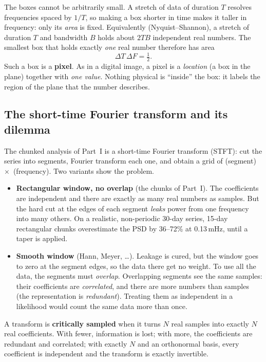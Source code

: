 \documentclass[11pt,a4paper]{article}
\begin{document}
The boxes cannot be arbitrarily small. A stretch of data of duration $T$ resolves
frequencies spaced by $1/T$, so making a box shorter in time makes it taller in
frequency: only its \emph{area} is fixed. Equivalently (Nyquist--Shannon), a stretch of
duration $T$ and bandwidth $B$ holds about $2TB$ independent real numbers. The
smallest box that holds exactly \emph{one} real number therefore has area
\begin{equation}
  \Delta T\,\Delta F = \tfrac12 .
\end{equation}
Such a box is a \textbf{pixel}. As in a digital image, a pixel is a \emph{location}
(a box in the plane) together with \emph{one value}. Nothing physical is ``inside''
the box: it labels the region of the plane that the number describes.

\subsection{The short-time Fourier transform and its dilemma}

The chunked analysis of Part~I is a short-time Fourier transform (STFT): cut the
series into segments, Fourier transform each one, and obtain a grid of
(segment)~$\times$~(frequency). Two variants show the problem.
\begin{itemize}
  \item \textbf{Rectangular window, no overlap} (the chunks of Part~I). The
        coefficients are independent and there are exactly as many real numbers as
        samples. But the hard cut at the edges of each segment \emph{leaks} power
        from one frequency into many others. On a realistic, non-periodic 30-day
        series, 15-day rectangular chunks overestimate the PSD by 36--72\% at
        0.13\,mHz, until a taper is applied.
  \item \textbf{Smooth window} (Hann, Meyer, \dots). Leakage is cured, but the window
        goes to zero at the segment edges, so the data there get no weight. To use
        all the data, the segments must \emph{overlap}. Overlapping segments see the
        same samples: their coefficients are \emph{correlated}, and there are more
        numbers than samples (the representation is \emph{redundant}). Treating them
        as independent in a likelihood would count the same data more than once.
\end{itemize}
A transform is \textbf{critically sampled} when it turns $N$ real samples into exactly
$N$ real coefficients. With fewer, information is lost; with more, the coefficients
are redundant and correlated; with exactly $N$ and an orthonormal basis, every
coefficient is independent and the transform is exactly invertible.
\end{document}
